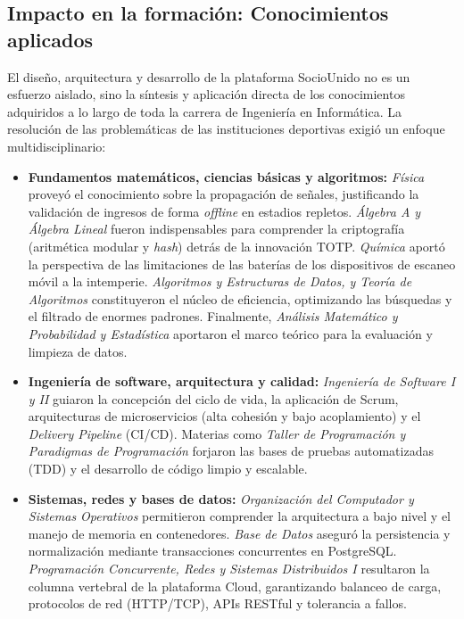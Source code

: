 \subsection{Impacto en la formación: Conocimientos aplicados}

El diseño, arquitectura y desarrollo de la plataforma SocioUnido no es un esfuerzo aislado, sino la síntesis y aplicación directa de los conocimientos adquiridos a lo largo de toda la carrera de Ingeniería en Informática. La resolución de las problemáticas de las instituciones deportivas exigió un enfoque multidisciplinario:

\begin{itemize}
    \item \textbf{Fundamentos matemáticos, ciencias básicas y algoritmos:} \textit{Física} proveyó el conocimiento sobre la propagación de señales, justificando la validación de ingresos de forma \textit{offline} en estadios repletos. \textit{Álgebra A y Álgebra Lineal} fueron indispensables para comprender la criptografía (aritmética modular y \textit{hash}) detrás de la innovación TOTP. \textit{Química} aportó la perspectiva de las limitaciones de las baterías de los dispositivos de escaneo móvil a la intemperie. \textit{Algoritmos y Estructuras de Datos, y Teoría de Algoritmos} constituyeron el núcleo de eficiencia, optimizando las búsquedas y el filtrado de enormes padrones. Finalmente, \textit{Análisis Matemático y Probabilidad y Estadística} aportaron el marco teórico para la evaluación y limpieza de datos.
    
    \item \textbf{Ingeniería de software, arquitectura y calidad:} \textit{Ingeniería de Software I y II} guiaron la concepción del ciclo de vida, la aplicación de Scrum, arquitecturas de microservicios (alta cohesión y bajo acoplamiento) y el \textit{Delivery Pipeline} (CI/CD). Materias como \textit{Taller de Programación y Paradigmas de Programación} forjaron las bases de pruebas automatizadas (TDD) y el desarrollo de código limpio y escalable.

    \item \textbf{Sistemas, redes y bases de datos:} \textit{Organización del Computador y Sistemas Operativos} permitieron comprender la arquitectura a bajo nivel y el manejo de memoria en contenedores. \textit{Base de Datos} aseguró la persistencia y normalización mediante transacciones concurrentes en PostgreSQL. \textit{Programación Concurrente, Redes y Sistemas Distribuidos I} resultaron la columna vertebral de la plataforma Cloud, garantizando balanceo de carga, protocolos de red (HTTP/TCP), APIs RESTful y tolerancia a fallos.


\end{itemize}
